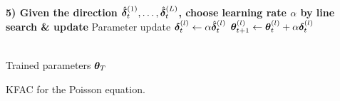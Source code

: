 \begin{algorithm}[!h]
\begin{small}
\begin{algorithmic}
        \\
        \State \textbf{5) Given the direction $\hat{{\bm{\delta}}}_t^{(1)}, \dots, \hat{{\bm{\delta}}}_t^{(L)}$, choose learning rate $\alpha$ by line search \& update}
         \Comment Parameter update
          \State ${\bm{\delta}}_t^{(l)} \gets \alpha \hat{{\bm{\delta}}}_t^{(l)}$
          \State ${\bm{\theta}}^{(l)}_{t+1} \gets {\bm{\theta}}^{(l)}_t + \alpha {\bm{\delta}}_t^{(l)}$
        \EndFor
      \EndFor

      \\
      \State \Return Trained parameters ${\bm{\theta}}_T$
    \end{algorithmic}
  \end{small}
    \caption{KFAC for the Poisson equation.}
\end{algorithm}
